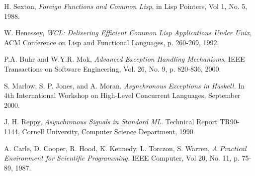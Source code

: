 \begin{thebibliography}{99}
 H. Sexton, {\em Foreign Functions and Common Lisp}, in Lisp Pointers, Vol 1, No. 5, 1988.

 W. Henessey, {\em WCL: Delivering Efficient Common Lisp Applications Under Unix},
ACM Conference on Lisp and Functional Languages, p. 260-269, 1992.

 P.A. Buhr and W.Y.R. Mok, {\em Advanced Exception Handling Mechanisms}, IEEE Transactions on Software Engineering,
Vol. 26, No. 9, p. 820-836, 2000. 

 S. Marlow, S. P. Jones, and A. Moran. {\em
Asynchronous Exceptions in Haskell.} In 4th International Workshop on
High-Level Concurrent Languages, September 2000.

 J. H. Reppy, {\em Asynchronous Signals in Standard ML}. Technical Report TR90-1144,
Cornell University, Computer Science Department, 1990.

 A. Carle, D. Cooper, R. Hood, K. Kennedy, L. Torczon, S. Warren, 
{\em A Practical Environment for Scientific Programming.}
IEEE Computer, Vol 20, No. 11, p. 75-89, 1987.






\end{thebibliography}










